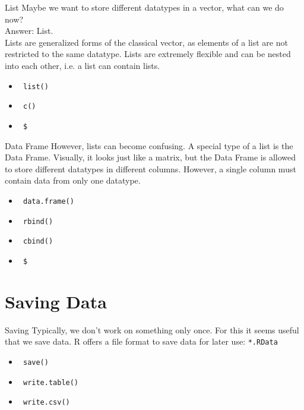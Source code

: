 \documentclass[xcolor=dvipsnames, aspectratio = 169]{beamer}
\begin{document}
\begin{frame}[fragile]{List}
	Maybe we want to store different datatypes in a vector, what can we do now?\\
	Answer: List.\\
	Lists are generalized forms of the classical vector, as elements of a list are not restricted to the same datatype. Lists are extremely flexible and can be nested into each other, i.e. a list can contain lists.
	\begin{itemize}
		\item \verb+ list()+
		\item \verb+ c()+
		\item \verb+ $ +
	\end{itemize}
\end{frame}

\begin{frame}[fragile]{Data Frame}
	However, lists can become confusing. A special type of a list is the Data Frame.
	Visually, it looks just like a matrix, but the Data Frame is allowed to store different datatypes in different columns. However, a single column must contain data from only one datatype.
	\begin{itemize}
		\item \verb+ data.frame()+
		\item \verb+ rbind()+
		\item \verb+ cbind()+
		\item \verb+ $+
	\end{itemize}
\end{frame}

\section{Saving Data}

\begin{frame}[fragile]{Saving}
	Typically, we don't work on something only once. For this it seems useful that we save data. R offers a file format to save data for later use: \verb+*.RData+
	\begin{itemize}
		\item \verb+ save()+
		\item \verb+ write.table()+
		\item \verb+ write.csv()+
	\end{itemize}
\end{frame}
\end{document}
